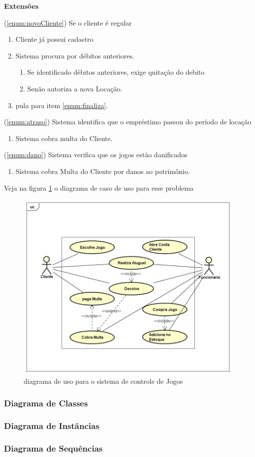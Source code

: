 \documentclass[a4paper,10pt]{article}
\begin{document}
\textbf{Extensões}

(\ref{enum:novoCliente}) Se o cliente é regular
	\begin{enumerate}
		\item Cliente já possui cadastro
		\item Sistema procura por débitos anteriores.
			\begin{enumerate}
				\item Se identificado débitos anteriores, exige quitação do debito
				\item Senão autoriza a nova Locação.
			\end{enumerate}
			\item pula para item \ref{enum:finaliza}.
	\end{enumerate}
	
(\ref{enum:atraso}) Sistema identifica que o empréstimo passou do período de locação
\begin{enumerate}
	\item Sistema cobra multa do Cliente.
\end{enumerate}

(\ref{enum:dano}) Sistema verifica que os jogos estão danificados
\begin{enumerate}
	\item Sistema cobra Multa do Cliente por danos ao patrimônio.
\end{enumerate}

Veja na figura \ref{fig:JogosCasosDeUso} o diagrama de caso de uso para esse problema

\begin{figure}%
\centering
\includegraphics[width=.7\columnwidth]{SistemaDeControleDeLocadoraDeJogos/CasoDeUso.jpg}%
\caption{diagrama de uso para o sistema de controle de Jogos}%
\label{fig:JogosCasosDeUso}%
\end{figure}

\subsubsection{Diagrama de Classes}
\subsubsection{Diagrama de Instâncias}
\subsubsection{Diagrama de Sequências}



 
\end{document}
